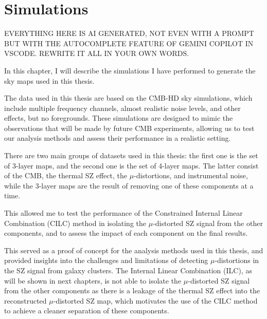 
\chapter{Simulations} \label{sec:simulations}

EVERYTHING HERE IS AI GENERATED, NOT EVEN WITH A PROMPT BUT WITH THE AUTOCOMPLETE FEATURE OF GEMINI COPILOT IN VSCODE. REWRITE IT ALL IN YOUR OWN WORDS.

In this chapter, I will describe the simulations I have performed to generate the sky maps used in this thesis.

The data used in this thesis are based on the CMB-HD sky simulations, which include multiple frequency channels, almost realistic noise levels, and other effects, but no foregrounds.
These simulations are designed to mimic the observations that will be made by future CMB experiments, allowing us to test our analysis methods and assess their performance in a realistic setting.



There are two main groups of datasets used in this thesis: the first one is the set of 3-layer maps, and the second one is the set of 4-layer maps.
The latter consist of the CMB, the thermal SZ effect, the $\mu$-distortions, and instrumental noise,
while the 3-layer maps are the result of removing one of these components at a time.

This allowed me to test the performance of the Constrained Internal Linear Combination (CILC) method in isolating the $\mu$-distorted SZ signal from the other components, and to assess the impact of each component on the final results.

This served as a proof of concept for the analysis methods used in this thesis, and provided insights into the challenges and limitations of detecting $\mu$-distortions in the SZ signal from galaxy clusters.
The Internal Linear Combination (ILC), as will be shown in next chapters, is not able to isolate the $\mu$-distorted SZ signal from the other components as there is a leakage of the thermal SZ effect into the reconstructed $\mu$-distorted SZ map,
which motivates the use of the CILC method to achieve a cleaner separation of these components.


